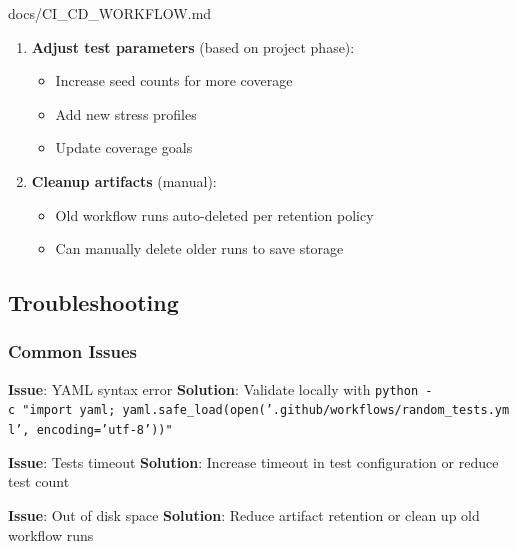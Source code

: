 \begin{relocated}{docs/CI_CD_WORKFLOW.md}
\begin{enumerate}
  \begin{itemize}
  \tightlist
  \item
    Verilator version
  \item
    Python packages
  \item
    GitHub Actions versions
  \end{itemize}
\item
  \textbf{Adjust test parameters} (based on project phase):

  \begin{itemize}
  \tightlist
  \item
    Increase seed counts for more coverage
  \item
    Add new stress profiles
  \item
    Update coverage goals
  \end{itemize}
\item
  \textbf{Cleanup artifacts} (manual):

  \begin{itemize}
  \tightlist
  \item
    Old workflow runs auto-deleted per retention policy
  \item
    Can manually delete older runs to save storage
  \end{itemize}
\end{enumerate}

\subsection{Troubleshooting}\label{um:flow:ci-cd-workflow:troubleshooting}

\subsubsection{Common Issues}\label{um:flow:ci-cd-workflow:common-issues}

\textbf{Issue}: YAML syntax error \textbf{Solution}: Validate locally
with
\texttt{python\ -\allowbreak{}c\ "import\ yaml;\ yaml.\allowbreak{}safe\_\allowbreak{}load(open('.\allowbreak{}github/\allowbreak{}workflows/\allowbreak{}random\_\allowbreak{}tests.\allowbreak{}yml',\allowbreak{}\ encoding=\allowbreak{}'utf-\allowbreak{}8'))"}

\textbf{Issue}: Tests timeout \textbf{Solution}: Increase timeout in
test configuration or reduce test count

\textbf{Issue}: Out of disk space \textbf{Solution}: Reduce artifact
retention or clean up old workflow runs


\end{relocated}
